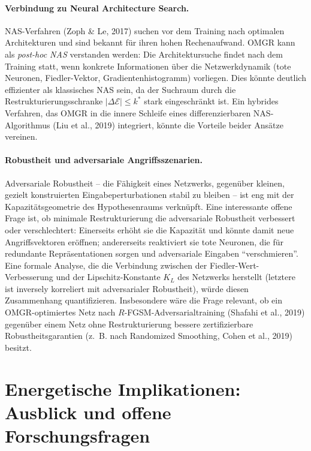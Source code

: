 \documentclass[12pt, a4paper, openany]{report}
\newcommand{\calE}{\mathcal{E}}
\begin{document}
\paragraph{Verbindung zu Neural Architecture Search.}
NAS-Verfahren (Zoph \& Le, 2017) suchen vor dem Training nach optimalen
Architekturen und sind bekannt für ihren hohen Rechenaufwand.  OMGR
kann als \emph{post-hoc NAS} verstanden werden: Die Architektursuche
findet nach dem Training statt, wenn konkrete Informationen über die
Netzwerkdynamik (tote Neuronen, Fiedler-Vektor, Gradientenhistogramm)
vorliegen.  Dies könnte deutlich effizienter als klassisches NAS sein,
da der Suchraum durch die Restrukturierungsschranke $|\Delta\calE| \leq k^*$
stark eingeschränkt ist.  Ein hybrides Verfahren, das OMGR in die innere
Schleife eines differenzierbaren NAS-Algorithmus (Liu et al., 2019)
integriert, könnte die Vorteile beider Ansätze vereinen.

\paragraph{Robustheit und adversariale Angriffsszenarien.}
Adversariale Robustheit -- die Fähigkeit eines Netzwerks, gegenüber
kleinen, gezielt konstruierten Eingabeperturbationen stabil zu bleiben --
ist eng mit der Kapazitätsgeometrie des Hypothesenraums verknüpft.
Eine interessante offene Frage ist, ob minimale Restrukturierung die
adversariale Robustheit verbessert oder verschlechtert: Einerseits erhöht
sie die Kapazität und könnte damit neue Angriffsvektoren eröffnen;
andererseits reaktiviert sie tote Neuronen, die für redundante Repräsentationen
sorgen und adversariale Eingaben ``verschmieren''.  Eine formale Analyse,
die die Verbindung zwischen der Fiedler-Wert-Verbesserung und der
Lipschitz-Konstante $K_L$ des Netzwerks herstellt (letztere ist inversely
korreliert mit adversarialer Robustheit), würde diesen Zusammenhang
quantifizieren.  Insbesondere wäre die Frage relevant, ob ein OMGR-optimiertes
Netz nach $R$-FGSM-Adversarialtraining (Shafahi et al., 2019) gegenüber
einem Netz ohne Restrukturierung bessere zertifizierbare Robustheitsgarantien
(z.~B. nach Randomized Smoothing, Cohen et al., 2019) besitzt.

\section{Energetische Implikationen: Ausblick und offene Forschungsfragen}
\label{sec:outlook_energy}
\end{document}
